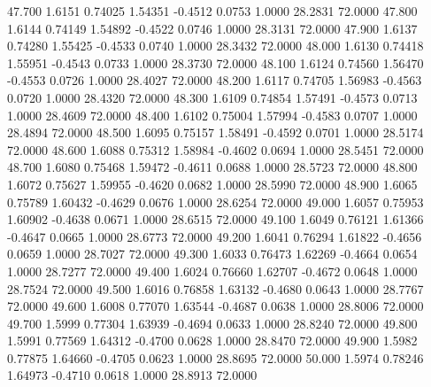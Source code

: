   47.700   1.6151   0.74025   1.54351  -0.4512   0.0753   1.0000  28.2831  72.0000
  47.800   1.6144   0.74149   1.54892  -0.4522   0.0746   1.0000  28.3131  72.0000
  47.900   1.6137   0.74280   1.55425  -0.4533   0.0740   1.0000  28.3432  72.0000
  48.000   1.6130   0.74418   1.55951  -0.4543   0.0733   1.0000  28.3730  72.0000
  48.100   1.6124   0.74560   1.56470  -0.4553   0.0726   1.0000  28.4027  72.0000
  48.200   1.6117   0.74705   1.56983  -0.4563   0.0720   1.0000  28.4320  72.0000
  48.300   1.6109   0.74854   1.57491  -0.4573   0.0713   1.0000  28.4609  72.0000
  48.400   1.6102   0.75004   1.57994  -0.4583   0.0707   1.0000  28.4894  72.0000
  48.500   1.6095   0.75157   1.58491  -0.4592   0.0701   1.0000  28.5174  72.0000
  48.600   1.6088   0.75312   1.58984  -0.4602   0.0694   1.0000  28.5451  72.0000
  48.700   1.6080   0.75468   1.59472  -0.4611   0.0688   1.0000  28.5723  72.0000
  48.800   1.6072   0.75627   1.59955  -0.4620   0.0682   1.0000  28.5990  72.0000
  48.900   1.6065   0.75789   1.60432  -0.4629   0.0676   1.0000  28.6254  72.0000
  49.000   1.6057   0.75953   1.60902  -0.4638   0.0671   1.0000  28.6515  72.0000
  49.100   1.6049   0.76121   1.61366  -0.4647   0.0665   1.0000  28.6773  72.0000
  49.200   1.6041   0.76294   1.61822  -0.4656   0.0659   1.0000  28.7027  72.0000
  49.300   1.6033   0.76473   1.62269  -0.4664   0.0654   1.0000  28.7277  72.0000
  49.400   1.6024   0.76660   1.62707  -0.4672   0.0648   1.0000  28.7524  72.0000
  49.500   1.6016   0.76858   1.63132  -0.4680   0.0643   1.0000  28.7767  72.0000
  49.600   1.6008   0.77070   1.63544  -0.4687   0.0638   1.0000  28.8006  72.0000
  49.700   1.5999   0.77304   1.63939  -0.4694   0.0633   1.0000  28.8240  72.0000
  49.800   1.5991   0.77569   1.64312  -0.4700   0.0628   1.0000  28.8470  72.0000
  49.900   1.5982   0.77875   1.64660  -0.4705   0.0623   1.0000  28.8695  72.0000
  50.000   1.5974   0.78246   1.64973  -0.4710   0.0618   1.0000  28.8913  72.0000
